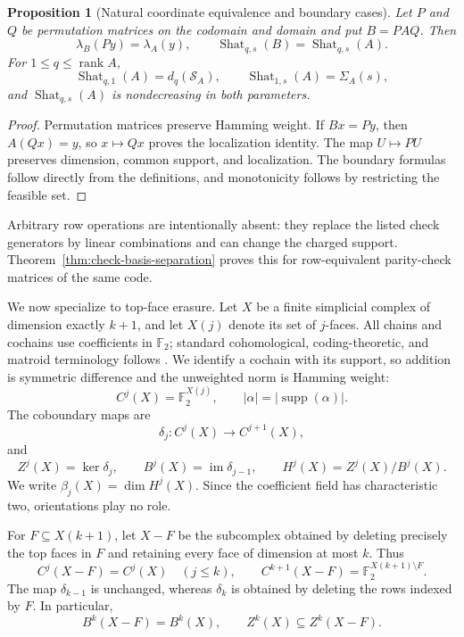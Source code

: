 \documentclass[11pt,letterpaper]{article}
\theoremstyle{plain}
\newtheorem{proposition}[theorem]{Proposition}
\theoremstyle{definition}
\newcommand{\F}{\mathbb{F}_2}
\newcommand{\cS}{\mathcal{S}}
\newcommand{\supp}{\operatorname{supp}}
\newcommand{\rank}{\operatorname{rank}}
\newcommand{\im}{\operatorname{im}}
\newcommand{\Shat}{\operatorname{Shat}}
\newcommand{\1}{\mathbf{1}}
\newcommand{\abs}[1]{\left|#1\right|}
\begin{document}
\begin{proposition}[Natural coordinate equivalence and boundary cases]
\label{prop:map-equivalence}
Let $P$ and $Q$ be permutation matrices on the codomain and domain and put
$B=PAQ$.  Then
\[
 \lambda_B(Py)=\lambda_A(y),\qquad
 \Shat_{q,s}(B)=\Shat_{q,s}(A).
\]
For $1\le q\le\rank A$,
\begin{equation}\label{eq:map-boundaries}
 \Shat_{q,1}(A)=d_q(\cS_A),
 \qquad
 \Shat_{1,s}(A)=\Sigma_A(s),
\end{equation}
and $\Shat_{q,s}(A)$ is nondecreasing in both parameters.
\end{proposition}

\begin{proof}
Permutation matrices preserve Hamming weight.  If $Bx=Py$, then $A(Qx)=y$,
so $x\mapsto Qx$ proves the localization identity.  The map $U\mapsto PU$
preserves dimension, common support, and localization.  The boundary formulas
follow directly from the definitions, and monotonicity follows by restricting
the feasible set.
\end{proof}

Arbitrary row operations are intentionally absent: they replace the listed
check generators by linear combinations and can change the charged support.
Theorem~\ref{thm:check-basis-separation} proves this for row-equivalent
parity-check matrices of the same code.

We now specialize to top-face erasure.  Let $X$ be a finite simplicial complex of dimension exactly $k+1$, and let $X(j)$ denote
its set of $j$-faces.  All chains and cochains use coefficients in $\F$; standard cohomological,
coding-theoretic, and matroid terminology follows
\cite{hatcher2002,macwilliamssloane1977,oxley2011}.  We identify a
cochain with its support, so addition is symmetric difference and the unweighted norm is
Hamming weight:
\[
 C^j(X)=\F^{X(j)},\qquad \abs{\alpha}=\abs{\supp(\alpha)}.
\]
The coboundary maps are
\[
 \delta_j:C^j(X)\longrightarrow C^{j+1}(X),
\]
and
\[
 Z^j(X)=\ker\delta_j,\qquad
 B^j(X)=\im\delta_{j-1},\qquad
 H^j(X)=Z^j(X)/B^j(X).
\]
We write $\beta_j(X)=\dim H^j(X)$.  Since the coefficient field has characteristic two,
orientations play no role.

For $F\subseteq X(k+1)$, let $X-F$ be the subcomplex obtained by deleting precisely the
top faces in $F$ and retaining every face of dimension at most $k$.  Thus
\[
 C^j(X-F)=C^j(X)\quad (j\le k),
 \qquad
 C^{k+1}(X-F)=\F^{X(k+1)\setminus F}.
\]
The map $\delta_{k-1}$ is unchanged, whereas $\delta_k$ is obtained by deleting the rows
indexed by $F$.  In particular,
\begin{equation}\label{eq:B-unchanged}
 B^k(X-F)=B^k(X),
 \qquad
 Z^k(X)\subseteq Z^k(X-F).
\end{equation}
\end{document}
